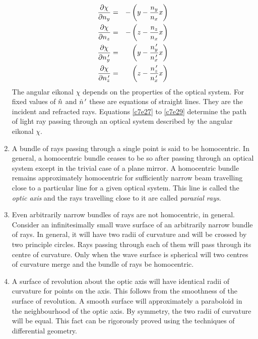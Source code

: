 \begin{enumerate}
\begin{eqnarray}
\frac{\partial{\chi}}{\partial{n_y}} &=& -\left(y - \frac{n_y}{n_x}x\right) \label{c7e27} \\
\frac{\partial{\chi}}{\partial{n_z}} &=& -\left(z - \frac{n_z}{n_x}x\right) \label{c7e28} \\
\frac{\partial{\chi}}{\partial{n_y^{\,\prime}}} &=& \left(y-\frac{n_y^{\,\prime}}{n_x^{\,\prime}}x\right) \label{c7e29}\\
\frac{\partial{\chi}}{\partial{n_z^{\,\prime}}} &=& \left(z-\frac{n_z^{\,\prime}}{n_x^{\,\prime}}x\right) \label{c7e30}
\end{eqnarray}
The angular eikonal $\chi$ depends on the properties of the optical system. For
fixed values of $\hat{n}$ and $\hat{n}^{\,\prime}$ these are equations of straight lines. They
are the incident and refracted rays. Equations \eqref{c7e27} to \eqref{c7e29}
determine the path of light ray passing through an optical system described by
the angular eikonal $\chi$.

\item A bundle of rays passing through a single point is said to be 
homocentric. In general, a homocentric bundle ceases to be so after passing 
through an optical system except in the trivial case of a plane mirror. A
homocentric bundle remains approximately homocentric for sufficiently narrow
beam travelling close to a particular line for a given optical system. This 
line is called the \emph{optic axis} and the rays travelling close to it are
called \emph{paraxial rays}.

\item Even arbitrarily narrow bundles of rays are not homocentric, in general.
Consider an infinitesimally small wave surface of an arbitrarily narrow bundle
of rays. In general, it will have two radii of curvature and will be crossed by
two principle circles. Rays passing through each of them will pass through its
centre of curvature. Only when the wave surface is spherical will two centres of
curvature merge and the bundle of rays be homocentric.

\item A surface of revolution about the optic axis will have identical radii of
curvature for points on the axis. This follows from the smoothness of the
surface of revolution. A smooth surface will approximately a paraboloid in the 
neighbourhood of the optic axis. By symmetry, the two radii of curvature will be
equal. This fact can be rigorously proved using the techniques of differential
geometry.


\end{enumerate}
